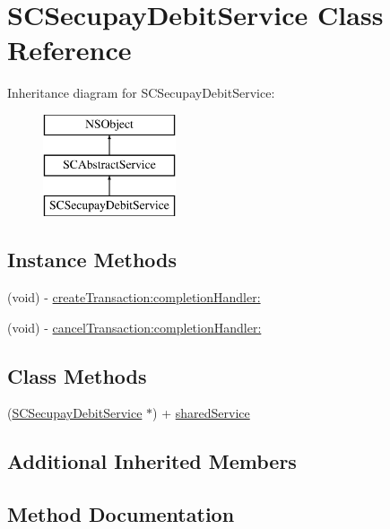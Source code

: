 \hypertarget{interface_s_c_secupay_debit_service}{}\section{S\+C\+Secupay\+Debit\+Service Class Reference}
\label{interface_s_c_secupay_debit_service}
Inheritance diagram for S\+C\+Secupay\+Debit\+Service\+:\begin{figure}[H]
\begin{center}
\leavevmode
\includegraphics[height=3.000000cm]{interface_s_c_secupay_debit_service}
\end{center}
\end{figure}
\subsection*{Instance Methods}
\begin{DoxyCompactItemize}
\item 
(void) -\/ \hyperlink{interface_s_c_secupay_debit_service_ae646f1253797f1c1263489576e02ef55}{create\+Transaction\+:completion\+Handler\+:}
\item 
(void) -\/ \hyperlink{interface_s_c_secupay_debit_service_a8b29ce42a4e77555d4ebe6368989124a}{cancel\+Transaction\+:completion\+Handler\+:}
\end{DoxyCompactItemize}
\subsection*{Class Methods}
\begin{DoxyCompactItemize}
\item 
(\hyperlink{interface_s_c_secupay_debit_service}{S\+C\+Secupay\+Debit\+Service} $\ast$) + \hyperlink{interface_s_c_secupay_debit_service_a4703564f808c568a91f3174cccf7999d}{shared\+Service}
\end{DoxyCompactItemize}
\subsection*{Additional Inherited Members}


\subsection{Method Documentation}
